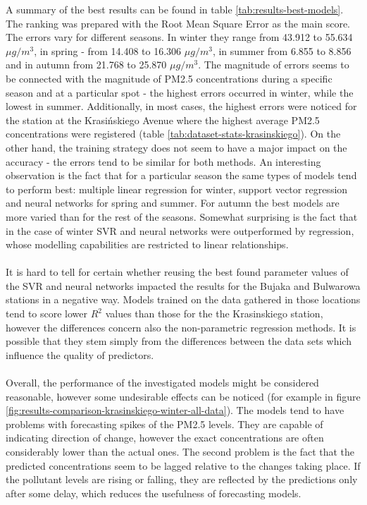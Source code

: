 A summary of the best results can be found in table \ref{tab:results-best-models}. The ranking was prepared with the Root Mean Square Error as the main score. The errors vary for different seasons. In winter they range from 43.912 to 55.634 $\mu g/m^3$, in spring - from 14.408 to 16.306 $\mu g/m^3$, in summer from 6.855 to 8.856 and in autumn from 21.768 to 25.870 $\mu g/m^3$. The magnitude of errors seems to be connected with the magnitude of PM2.5 concentrations during a specific season and at a particular spot - the highest errors occurred in winter, while the lowest in summer. Additionally, in most cases, the highest errors were noticed for the station at the Krasińskiego Avenue where the highest average PM2.5 concentrations were registered (table \ref{tab:dataset-stats-krasinskiego}). On the other hand, the training strategy does not seem to have a major impact on the accuracy - the errors tend to be similar for both methods. An interesting observation is the fact that for a particular season the same types of models tend to perform best: multiple linear regression for winter, support vector regression and neural networks for spring and summer. For autumn the best models are more varied than for the rest of the seasons. Somewhat surprising is the fact that in the case of winter SVR and neural networks were outperformed by regression, whose modelling capabilities are restricted to linear relationships.
\\\\
It is hard to tell for certain whether reusing the best found parameter values of the SVR and neural networks impacted the results for the Bujaka and Bulwarowa stations in a negative way. Models trained on the data gathered in those locations tend to score lower $R^2$ values than those for the the Krasinskiego station, however the differences concern also the non-parametric regression methods. It is possible that they stem simply from the differences between the data sets which influence the quality of predictors. 
\\\\
Overall, the performance of the investigated models might be considered reasonable, however some undesirable effects can be noticed (for example in figure \ref{fig:results-comparison-krasinskiego-winter-all-data}). The models tend to have problems with forecasting spikes of the PM2.5 levels. They are capable of indicating direction of change, however the exact concentrations are often considerably lower than the actual ones. The second problem is the fact that the predicted concentrations seem to be lagged relative to the changes taking place. If the pollutant levels are rising or falling, they are reflected by the predictions only after some delay, which reduces the usefulness of forecasting models.
